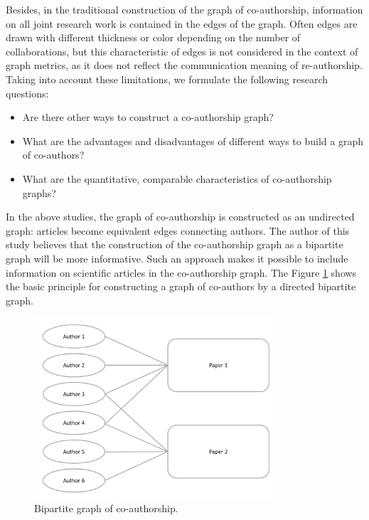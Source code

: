 \documentclass[12pt]{report}
\theoremstyle{definition}
\begin{document}
Besides, in the traditional construction of the graph of co-authorship, information on all joint research work is contained in the edges of the graph. 
Often edges are drawn with different thickness or color depending on the number of collaborations, but this characteristic of edges is not considered in the context of graph metrics, as it does not reflect the communication meaning of re-authorship.
Taking into account these limitations, we formulate the following research questions:

\begin{itemize}
	\item Are there other ways to construct a co-authorship graph? 
	\item What are the advantages and disadvantages of different ways to build a graph of co-authors? 
	\item What are the quantitative, comparable characteristics of co-authorship graphs?
\end{itemize}

In the above studies, the graph of co-authorship is constructed as an undirected graph: articles become equivalent edges connecting authors.
The author of this study believes that the construction of the co-authorship graph as a bipartite graph will be more informative.
Such an approach makes it possible to include information on scientific articles in the co-authorship graph.
The Figure \ref{fig:bi1} shows the basic principle for constructing a graph of co-authors by a directed bipartite graph.

\begin{figure}[ht]
	\centering
	\includegraphics[width=0.8\textwidth]{bi1eng}
	\caption{Bipartite graph of co-authorship.}
	\label{fig:bi1}
\end{figure}  
\end{document}

